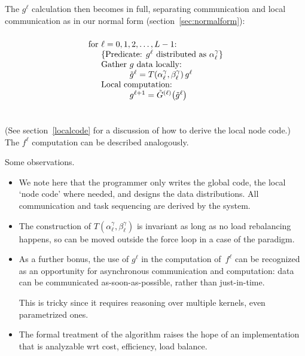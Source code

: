 The $g^\ell$ calculation then becomes in full, separating communication
and local communication as in our normal form (section~\ref{sec:normalform}):
\[ \vbox{\hsize=5in
\begin{tabbing}
for \=$\ell=0,1,2,\ldots,L-1$:\\
\> $\{ \hbox{Predicate: $g^\ell$ distributed as $\alpha^\gamma_\ell$} \}$\\
\> Gather \=$g$ data locally: \\
\>\> $\tilde g^\ell=T(\alpha^\gamma_\ell,\beta^\gamma_\ell)\,g^\ell$\\
\> Local computation:\\
\>\> $g^{\ell+1}=\tilde G^{(\ell)}\bigl( \tilde g^\ell \bigr)$\\
\end{tabbing}
}
\]
(See section~\ref{localcode} for a discussion of how to derive the local node code.)
The $f^\ell$ computation can be described analogously.

Some observations.
\begin{itemize}
\item We note here that the programmer only writes the global code,
  the local `node code' where needed, and designs the data
  distributions. All communication and task sequencing are derived by
  the system.
\item The construction of $T(\alpha^\gamma_\ell,\beta^\gamma_\ell)$ is
  invariant as long as no load rebalancing happens, so can be moved
  outside the force loop in a case of the 
  paradigm.
\item As a further bonus, the use of $g^\ell$ in the computation
  of~$f^\ell$ can be recognized as an opportunity for asynchronous
  communication and computation: data can be communicated
  as-soon-as-possible, rather than just-in-time.

  This is tricky since it requires reasoning over multiple kernels, even
  parametrized ones.
\item The formal treatment of the algorithm raises the hope of an
  implementation that is analyzable wrt cost, efficiency, load
  balance.
\end{itemize}

\endinput

\def\sk{^{(k)}}
\def\sK{^{(K)}}
\def\skp{^{(k+1)}}

Formally, we consider our domain to have $K$ refinement level, with on
level $k$ elements $e\sk_\ell$ for $\ell=0,\ldots,\beta^k-1$, where
$\beta=2,4,8$ for $1,2,3$-dimensional problems respectively. For each
element $e\sk_\ell$ on the bottom level we compute a center of mass
$m\sk_\ell$ from the particles contained in it; on levels
$k=1,\ldots,K-1$ we compute a center of mass from the elements
contained in it:
\[ m\sk_\ell = f(m\skp_0,\ldots,m\skp_{\beta-1}). \]
This can be implemented in our programming model using a pipeline with
a finite running time of~$K$ stages.

